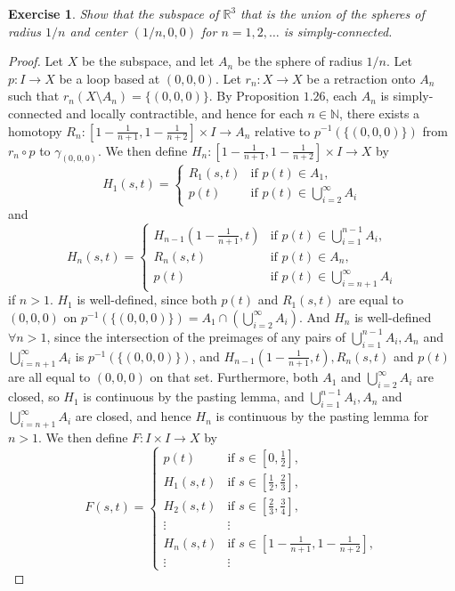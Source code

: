 \documentclass{article}
\newtheorem{exercise}{Exercise}[subsection]
\begin{document}
\begin{exercise}
Show that the subspace of $\mathbb{R}^3$ that is the union of the spheres of radius $1/n$ and center $(1/n,0,0)$ for $n=1,2,\dots$ is simply-connected.
\end{exercise}
\begin{proof}
Let $X$ be the subspace, and let $A_n$ be the sphere of radius $1/n$. Let $p:I\to X$ be a loop based at $(0,0,0)$. Let $r_n:X\to X$ be a retraction onto $A_n$ such that $r_n(X\setminus A_n)=\{(0,0,0)\}$. By Proposition $1.26$, each $A_n$ is simply-connected and locally contractible, and hence for each $n\in\mathbb{N}$, there exists a homotopy $R_n:[1-\frac{1}{n+1},1-\frac{1}{n+2}]\times I\to A_n$ relative to $p^{-1}(\{(0,0,0)\})$ from $r_n\circ p$ to $\gamma_{(0,0,0)}$. We then define $H_n:[1-\frac{1}{n+1},1-\frac{1}{n+2}]\times I\to X$ by\[H_1(s,t)=\begin{cases}
    R_1(s,t)&\text{if }p(t)\in A_1,\\p(t)&\text{if }p(t)\in\bigcup_{i=2}^\infty A_i
\end{cases}\]and\[H_n(s,t)=\begin{cases}
    H_{n-1}(1-\frac{1}{n+1},t)&\text{if }p(t)\in \bigcup_{i=1}^{n-1} A_i,\\R_n(s,t)&\text{if }p(t)\in A_n,\\p(t)&\text{if }p(t)\in\bigcup_{i=n+1}^\infty A_i
\end{cases}\]if $n>1$. $H_1$ is well-defined, since both $p(t)$ and $R_1(s,t)$ are equal to $(0,0,0)$ on $p^{-1}(\{(0,0,0)\})=A_1\cap(\bigcup_{i=2}^\infty A_i)$. And $H_n$ is well-defined $\forall n>1$, since the intersection of the preimages of any pairs of $\bigcup_{i=1}^{n-1}A_i,A_n$ and $\bigcup_{i=n+1}^\infty A_i$ is $p^{-1}(\{(0,0,0)\})$, and $H_{n-1}(1-\frac{1}{n+1},t),R_n(s,t)$ and $p(t)$ are all equal to $(0,0,0)$ on that set. Furthermore, both $A_1$ and $\bigcup_{i=2}^\infty A_i$ are closed, so $H_1$ is continuous by the pasting lemma, and $\bigcup_{i=1}^{n-1}A_i,A_n$ and $\bigcup_{i=n+1}^\infty A_i$ are closed, and hence $H_n$ is continuous by the pasting lemma for $n>1$. We then define $F:I\times I\to X$ by\[F(s,t)=\begin{cases}
    p(t)&\text{if }s\in[0,\frac{1}{2}],\\H_1(s,t)&\text{if }s\in[\frac{1}{2},\frac{2}{3}],\\H_2(s,t)&\text{if }s\in[\frac{2}{3},\frac{3}{4}],\\\vdots&\vdots\\H_n(s,t)&\text{if }s\in[1-\frac{1}{n+1},1-\frac{1}{n+2}],\\\vdots&\vdots

\end{cases}\]
\end{proof}
\end{document}
